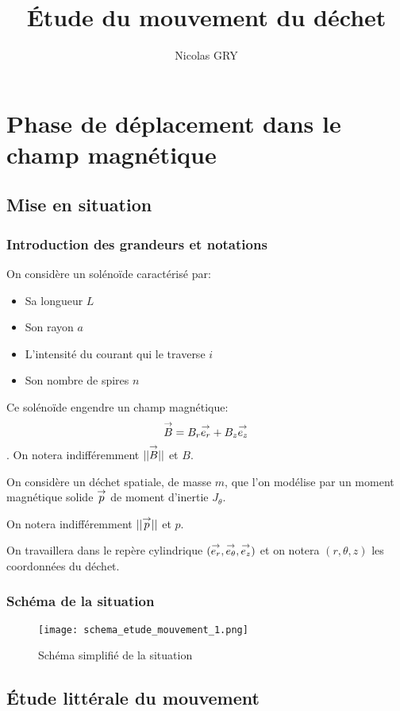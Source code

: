 \documentclass{report}
\author{Nicolas GRY}
\title{Étude du mouvement du déchet}
\begin{document}
\maketitle
\tableofcontents
\newpage
\chapter{Phase de déplacement dans le champ magnétique}
\section{Mise en situation}
\subsection{Introduction des grandeurs et notations}

On considère un solénoïde caractérisé par:
\begin{itemize}
    \item Sa longueur $L$
    \item Son rayon $a$
    \item L'intensité du courant qui le traverse $i$
    \item Son nombre de spires $n$ 
\end{itemize}
Ce solénoïde engendre un champ magnétique:
 $$\overset{\to}{B} = B_r \overset{\to}{e_r} + B_z \overset{\to}{e_z}$$.
On notera indifféremment $||\overset{\to}{B}||$ et $B$.

On considère un déchet spatiale, de masse $m$, que l'on modélise par un moment magnétique solide $\overset{\to}{p}$ de moment d'inertie $J_\theta$. 

On notera indifféremment $||\overset{\to}{p}||$ et $p$.

On travaillera dans le repère cylindrique $(\overset{\to}{e_r},\overset{\to}{e_\theta},\overset{\to}{e_z})$ et on notera $(r,\theta,z)$ les coordonnées du déchet.

\subsection{Schéma de la situation}

\begin{figure}[h]
    \centering
    \texttt{[image: schema\_etude\_mouvement\_1.png]}
    \caption{Schéma simplifié de la situation}
\end{figure}  

\section{Étude littérale du mouvement}
\end{document}
